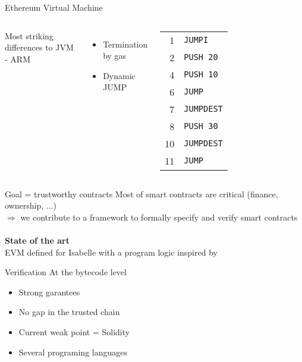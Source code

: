 \documentclass{beamer}
\begin{document}
\begin{frame}{Ethereum Virtual Machine \footnotesize{\cite{wood2014ethereum}}}
	\begin{columns}[c]
		Most striking differences to JVM - ARM
		\begin{itemize}
			\item Termination by gas
			\item Dynamic JUMP
		\end{itemize}
		\begin{tabular}{r l}
			1 & \texttt{JUMPI} \\
			2 & \texttt{PUSH~20}\\
			4 & \texttt{PUSH~10}\\
			6 & \texttt{JUMP}\\
			7 & \texttt{JUMPDEST}\\
			8 & \texttt{PUSH~30}\\
			10 & \texttt{JUMPDEST}\\
			11 & \texttt{JUMP}
		\end{tabular}
	\end{columns}
\end{frame}

\begin{frame}{Goal = trustworthy contracts}
	Most of smart contracts are critical (finance, ownership, ...)\\
	$\Rightarrow$ we contribute to a framework to formally specify and verify smart contracts
	\\ ~ \\
	\textbf{State of the art} \\
	EVM defined for Isabelle \cite{hirai2017defining} with a program logic inspired by \cite{Myreen09}
\end{frame}

\begin{frame}{Verification}
	At the bytecode level
	\begin{itemize}
		\item Strong garantees
		\item No gap in the trusted chain
		\item Current weak point = Solidity
		\item Several programing languages
	\end{itemize}
\end{frame}
\end{document}
